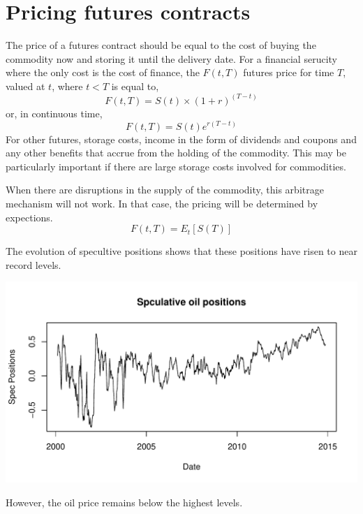 \documentclass[12pt, a4paper, oneside]{article}\usepackage[]{graphicx}\usepackage[]{color}
\makeatletter
\def\maxwidth{ %
  \ifdim\Gin@nat@width>\linewidth
    \linewidth
  \else
    \Gin@nat@width
  \fi
}
\newenvironment{knitrout}{}{} %
\makeatother
\begin{document}
\section*{Pricing futures contracts}
The price of a futures contract should be equal to the cost of buying the commodity now and storing it until the delivery date.  For a financial serucity where the only cost is the cost of finance, the $F(t, T)$ futures price for time $T$, valued at $t$, where $t<T$ is equal to, 
\begin{equation*}
F(t, T) = S(t) \times (1 +r)^{(T-t)}
\end{equation*}
or, in continuous time, 
\begin{equation*}
F(t, T) = S(t)e^{r(T-t)}
\end{equation*}
For other futures, storage costs, income in the form of dividends and coupons and any other benefits that accrue from the holding of the commodity. This may be particularly important if there are large storage costs involved for commodities.

When there are disruptions in the supply of the commodity, this arbitrage mechanism will not work. In that case, the pricing will be determined by expections. 
\begin{equation*}
F(t, T) = E_t[S(T)]
\end{equation*}

The evolution of specultive positions shows that these positions have risen to near record levels.   
\begin{knitrout}
\color{fgcolor}

{\centering \includegraphics[width=\maxwidth]{figure/Oilspec-1} 

}



\end{knitrout}
However, the oil price remains below the highest levels. 
\end{document}
